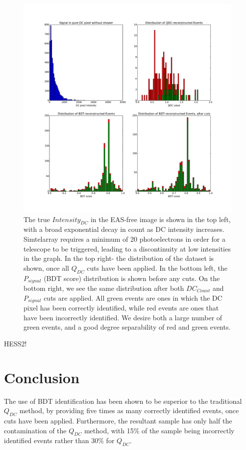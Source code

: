 \documentclass[]{article}
\begin{document}
\begin{figure}
\begin{center}
\includegraphics[width=\textwidth]{cutdistribution1None}
\caption{The true $Intensity_{DC}$ in the EAS-free image is shown in the top left, with a broad exponential decay in count as DC intensity increases. Sim\textunderscore telarray requires a minimum of 20 photoelectrons in order for a telescope to be triggered, leading to a discontinuity at low intensities in the graph.  In the top right- the distribution of the dataset is shown, once all $Q_{DC}$ cuts have been applied. In the bottom left, the $P_{signal}$ (BDT score) distribution is shown before any cuts. On the bottom right, we see the same distribution after both $DC_{Count}$ and $P_{signal}$ cuts are applied. All green events are ones in which the DC pixel has been correctly identified, while red events are ones that have been incorrectly identified. We desire both a large number of green events, and a good degree separability of red and green events.}
\label{fig:cutdistribution}
\end{center}
\end{figure}

HESS2!

\section{Conclusion}
The use of BDT identification has been shown to be superior to the traditional $Q_{DC}$ method, by providing five times as many correctly identified events, once cuts have been applied. Furthermore, the resultant sample has only half the contamination of the $Q_{DC}$ method, with 15\% of the sample being incorrectly identified events rather than 30\% for $Q_{DC}$.



\end{document}
